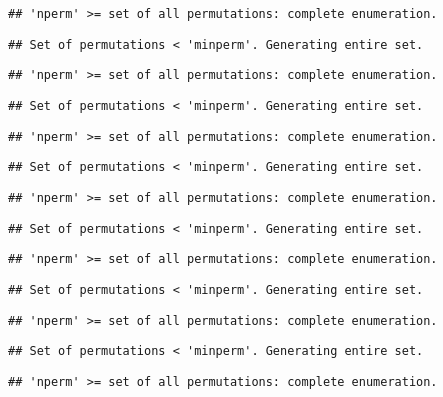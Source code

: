 \documentclass[]{article}
\begin{document}
\begin{verbatim}
## 'nperm' >= set of all permutations: complete enumeration.
\end{verbatim}

\begin{verbatim}
## Set of permutations < 'minperm'. Generating entire set.
\end{verbatim}

\begin{verbatim}
## 'nperm' >= set of all permutations: complete enumeration.
\end{verbatim}

\begin{verbatim}
## Set of permutations < 'minperm'. Generating entire set.
\end{verbatim}

\begin{verbatim}
## 'nperm' >= set of all permutations: complete enumeration.
\end{verbatim}

\begin{verbatim}
## Set of permutations < 'minperm'. Generating entire set.
\end{verbatim}

\begin{verbatim}
## 'nperm' >= set of all permutations: complete enumeration.
\end{verbatim}

\begin{verbatim}
## Set of permutations < 'minperm'. Generating entire set.
\end{verbatim}

\begin{verbatim}
## 'nperm' >= set of all permutations: complete enumeration.
\end{verbatim}

\begin{verbatim}
## Set of permutations < 'minperm'. Generating entire set.
\end{verbatim}

\begin{verbatim}
## 'nperm' >= set of all permutations: complete enumeration.
\end{verbatim}

\begin{verbatim}
## Set of permutations < 'minperm'. Generating entire set.
\end{verbatim}

\begin{verbatim}
## 'nperm' >= set of all permutations: complete enumeration.
\end{verbatim}
\end{document}
